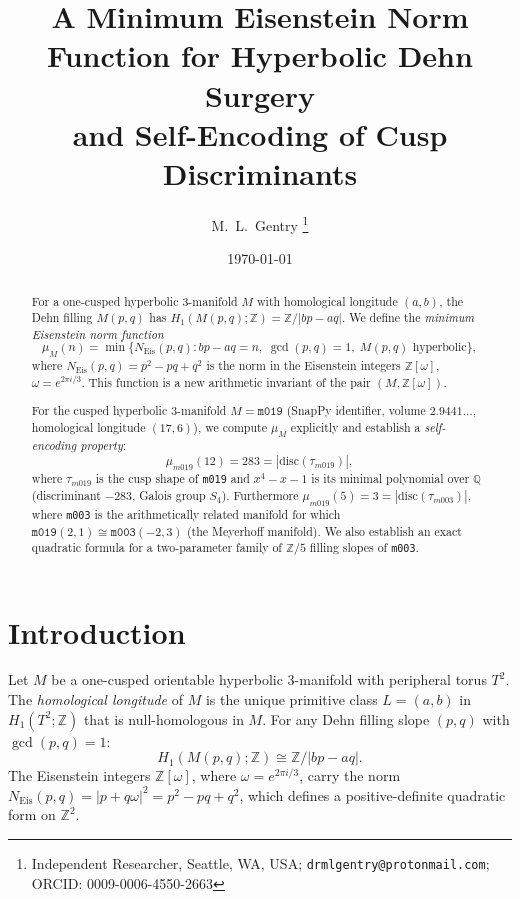 \documentclass[11pt,a4paper]{article}
\theoremstyle{definition}
\theoremstyle{remark}
\newcommand{\Z}{\mathbb{Z}}
\newcommand{\Q}{\mathbb{Q}}
\newcommand{\mfld}[1]{\texttt{#1}}
\newcommand{\NEis}{N_{\mathrm{Eis}}}
\begin{document}
\title{A Minimum Eisenstein Norm Function for Hyperbolic Dehn Surgery\\
and Self-Encoding of Cusp Discriminants}

\author{M.~L.~Gentry%
\thanks{Independent Researcher, Seattle, WA, USA;
\texttt{drmlgentry@protonmail.com};
ORCID: 0009-0006-4550-2663}}
\date{\today}
\maketitle

\begin{abstract}
For a one-cusped hyperbolic 3-manifold $M$ with homological
longitude $(a,b)$, the Dehn filling $M(p,q)$ has
$H_1(M(p,q);\Z) = \Z/|bp - aq|$.
We define the \emph{minimum Eisenstein norm function}
\[
\mu_M(n) = \min\bigl\{
  \NEis(p,q) : bp - aq = n,\;
  \gcd(p,q)=1,\;
  M(p,q)\text{ hyperbolic}
\bigr\},
\]
where $\NEis(p,q) = p^2 - pq + q^2$ is the norm in the
Eisenstein integers $\Z[\omega]$, $\omega = e^{2\pi i/3}$.
This function is a new arithmetic invariant of the pair
$(M, \Z[\omega])$.

For the cusped hyperbolic 3-manifold $M = \mfld{m019}$
(SnapPy identifier, volume $2.9441\ldots$, homological
longitude $(17,6)$), we compute $\mu_M$ explicitly and
establish a \emph{self-encoding property}:
\[
\mu_{m019}(12) = 283 = |\mathrm{disc}(\tau_{m019})|,
\]
where $\tau_{m019}$ is the cusp shape of \mfld{m019}
and $x^4 - x - 1$ is its minimal polynomial over $\Q$
(discriminant $-283$, Galois group $S_4$).
Furthermore $\mu_{m019}(5) = 3 = |\mathrm{disc}(\tau_{m003})|$,
where \mfld{m003} is the arithmetically related manifold
for which $\mfld{m019}(2,1) \cong \mfld{m003}(-2,3)$
(the Meyerhoff manifold).
We also establish an exact quadratic formula for a
two-parameter family of $\Z/5$ filling slopes of \mfld{m003}.
\end{abstract}

\section{Introduction}

Let $M$ be a one-cusped orientable hyperbolic 3-manifold
with peripheral torus $T^2$.
The \emph{homological longitude} of $M$ is the unique
primitive class $L = (a,b)$ in $H_1(T^2;\Z)$ that
is null-homologous in $M$.
For any Dehn filling slope $(p,q)$ with $\gcd(p,q)=1$:
\begin{equation}
H_1(M(p,q);\Z) \cong \Z/|bp - aq|.
\label{eq:H1}
\end{equation}
The Eisenstein integers $\Z[\omega]$, where
$\omega = e^{2\pi i/3}$, carry the norm
$\NEis(p,q) = |p + q\omega|^2 = p^2 - pq + q^2$,
which defines a positive-definite quadratic form on $\Z^2$.
\end{document}
